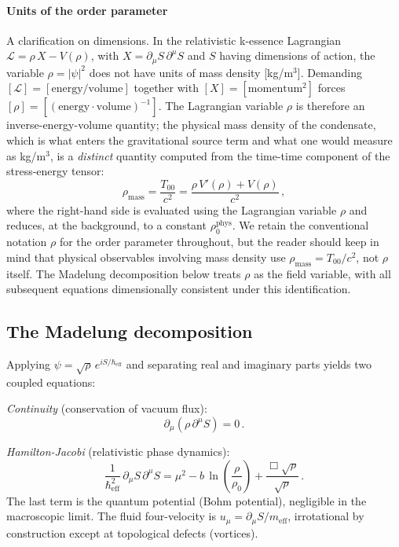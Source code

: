 \documentclass[12pt, a4paper]{article}
\begin{document}
\paragraph{Units of the order parameter}
A clarification on dimensions. In the relativistic k-essence Lagrangian $\mathcal{L} = \rho\,X - V(\rho)$, with $X = \partial_\mu S\,\partial^\mu S$ and $S$ having dimensions of action, the variable $\rho = |\psi|^2$ does not have units of mass density [kg/m$^3$]. Demanding $[\mathcal{L}] = [\text{energy}/\text{volume}]$ together with $[X] = [\text{momentum}^2]$ forces $[\rho] = [(\text{energy}\cdot\text{volume})^{-1}]$. The Lagrangian variable $\rho$ is therefore an inverse-energy-volume quantity; the physical mass density of the condensate, which is what enters the gravitational source term and what one would measure as kg/m$^3$, is a \emph{distinct} quantity computed from the time-time component of the stress-energy tensor:
\begin{equation}
    \rho_{\mathrm{mass}} = \frac{T_{00}}{c^2} = \frac{\rho\,V'(\rho) + V(\rho)}{c^2}\,,
\label{eq:physical_mass_density}
\end{equation}
where the right-hand side is evaluated using the Lagrangian variable $\rho$ and reduces, at the background, to a constant $\rho_0^{\mathrm{phys}}$. We retain the conventional notation $\rho$ for the order parameter throughout, but the reader should keep in mind that physical observables involving mass density use $\rho_{\mathrm{mass}} = T_{00}/c^2$, not $\rho$ itself. The Madelung decomposition below treats $\rho$ as the field variable, with all subsequent equations dimensionally consistent under this identification.

\subsection{The Madelung decomposition}

Applying $\psi = \sqrt{\rho}\,e^{iS/\hbar_{\mathrm{eff}}}$ and separating real and imaginary parts yields two coupled equations:

\emph{Continuity} (conservation of vacuum flux):
\begin{equation}
    \partial_\mu(\rho\,\partial^\mu S) = 0\,.
\label{eq:continuity}
\end{equation}

\emph{Hamilton-Jacobi} (relativistic phase dynamics):
\begin{equation}
    \frac{1}{\hbar_{\mathrm{eff}}^2}\,\partial_\mu S\,\partial^\mu S = \mu^2 - b\,\ln\!\left(\frac{\rho}{\rho_0}\right) + \frac{\Box\sqrt{\rho}}{\sqrt{\rho}}\,.
\label{eq:hj}
\end{equation}
The last term is the quantum potential (Bohm potential), negligible in the macroscopic limit. The fluid four-velocity is $u_\mu = \partial_\mu S/m_{\mathrm{eff}}$, irrotational by construction except at topological defects (vortices).
\end{document}
